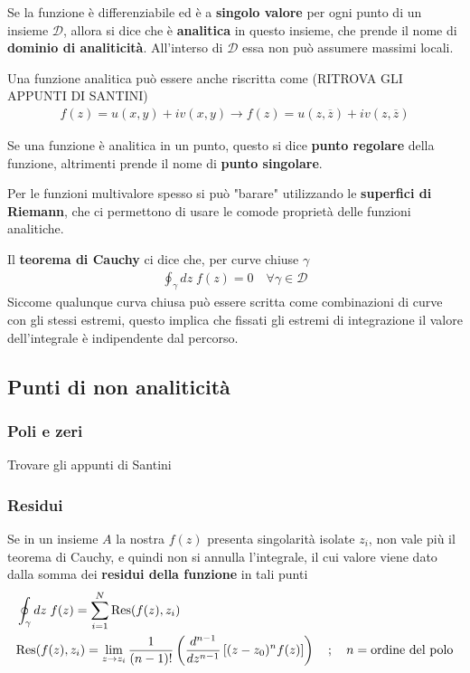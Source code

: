 Se la funzione è differenziabile ed è a \textbf{singolo valore} per ogni punto di un insieme $\mathcal{D}$, allora si dice che è \textbf{analitica} in questo insieme, che prende il nome di \textbf{dominio di analiticità}. All'interso di $\mathcal{D}$ essa non può assumere massimi locali.

Una funzione analitica può essere anche riscritta come (RITROVA GLI APPUNTI DI SANTINI)
\begin{align}
	f(z) = u(x,y) + iv(x,y) \to f(z) = u(z,\overline{z}) + i v(z,\overline{z})
\end{align}

Se una funzione è analitica in un punto, questo si dice \textbf{punto regolare} della funzione, altrimenti prende il nome di \textbf{punto singolare}.

Per le funzioni multivalore spesso si può "barare" utilizzando le \textbf{superfici di Riemann}, che ci permettono di usare le comode proprietà delle funzioni analitiche.

Il \textbf{teorema di Cauchy} ci dice che, per curve chiuse $\gamma$
\begin{align}
	\oint_\gamma dz \; f(z) = 0 \quad \forall \gamma \in \mathcal{D}
\end{align}
Siccome qualunque curva chiusa può essere scritta come combinazioni di curve con gli stessi estremi, questo implica che fissati gli estremi di integrazione il valore dell'integrale è indipendente dal percorso.


\newpage
\subsection{Punti di non analiticità}

\subsubsection{Poli e zeri}

Trovare gli appunti di Santini

\subsubsection{Residui}

Se in un insieme $A$ la nostra $f(z)$ presenta singolarità isolate $z_i$, non vale più il teorema di Cauchy, e quindi non si annulla l'integrale, il cui valore viene dato dalla somma dei \textbf{residui della funzione} in tali punti
\begin{align}
	&\oint_\gamma dz \; f(z) = \sum_{i=1}^N \text{Res} (f(z), z_i)\\
	&\text{Res} (f(z), z_i) = \underset{z \rightarrow z_i}{\lim} \, \frac{1}{(n-1)!} \left( \frac{d^{n-1}}{dz^{n-1}} \left[ (z-z_0)^n f(z) \right] \right) \quad ; \quad n = \text{ordine del polo}
\end{align}


